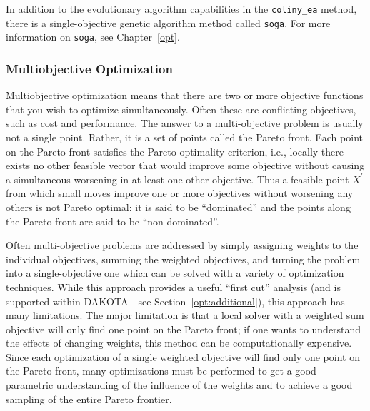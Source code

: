 In addition to the evolutionary algorithm capabilities in the
\texttt{coliny\_ea} method, there is a single-objective genetic algorithm
method called \texttt{soga}.
For more information on \texttt{soga}, see Chapter~\ref{opt}.

\subsubsection{Multiobjective Optimization}\label{tutorial:example:optimization:multiobjective}

Multiobjective optimization means that there are two or more
objective functions that you wish to optimize simultaneously.  Often
these are conflicting objectives, such as cost and performance.  The
answer to a multi-objective problem is usually not a single point.
Rather, it is a set of points called the Pareto front.  Each point
on the Pareto front satisfies the Pareto optimality criterion, i.e.,
locally there exists no other feasible vector that would improve some
objective without causing a simultaneous worsening in at least one
other objective.  Thus a feasible point $X^\prime$ from which
small moves improve one or more objectives without worsening
any others is not Pareto optimal: it is said to be ``dominated''
and the points along the Pareto front are said to be
``non-dominated''.

Often multi-objective problems are addressed by simply assigning
weights to the individual objectives, summing the weighted
objectives, and turning the problem into a single-objective one
which can be solved with a variety of optimization techniques. While
this approach provides a useful ``first cut'' analysis (and is
supported within DAKOTA---see Section~\ref{opt:additional}), this
approach has many limitations.  The major limitation is that a
local solver with a weighted sum objective will only find one
point on the Pareto front; if one wants to understand
the effects of changing weights, this method can be computationally
expensive.  Since each optimization of a single weighted objective
will find only one point on the Pareto front, many
optimizations must be performed to get a good parametric
understanding of the influence of the weights and to achieve a good
sampling of the entire Pareto frontier.

